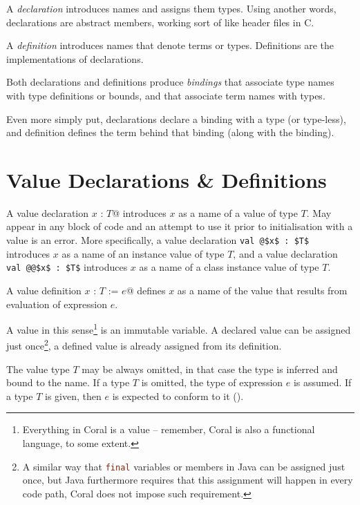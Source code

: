 A {\em declaration} introduces names and assigns them types. Using another words, declarations are abstract members, working sort of like header files in C. 

A {\em definition} introduces names that denote terms or types. Definitions are the implementations of declarations. 

Both declarations and definitions produce {\em bindings} that associate type names with type definitions or bounds, and that associate term names with types. 

Even more simply put, declarations declare a binding with a type (or type-less), and definition defines the term behind that binding (along with the binding). 


\section{Value Declarations \& Definitions}
\label{sec:value-dcl-def}

A value declaration \lstinline@val $x$ : $T$@ introduces $x$ as a name of a value of type $T$. May appear in any block of code and an attempt to use it prior to initialisation with a value is an error. More specifically, a value declaration \lstinline+val @$x$ : $T$+ introduces $x$ as a name of an instance value of type $T$, and a value declaration \lstinline+val @@$x$ : $T$+ introduces $x$ as a name of a class instance value of type $T$. 

A value definition \lstinline@val $x$ : $T$ := $e$@ defines $x$ as a name of the value that results from evaluation of expression $e$.

A value in this sense\footnote{Everything in Coral is a value -- remember, Coral is also a functional language, to some extent.} is an immutable variable. A declared value can be assigned just once\footnote{A similar way that \lstinline[language=Java]@final@ variables or members in Java can be assigned just once, but Java furthermore requires that this assignment will happen in every code path, Coral does not impose such requirement.}, a defined value is already assigned from its definition. 

The value type $T$ may be always omitted, in that case the type is inferred and bound to the name. If a type $T$ is omitted, the type of expression $e$ is assumed. If a type $T$ is given, then $e$ is expected to conform to it (). 

